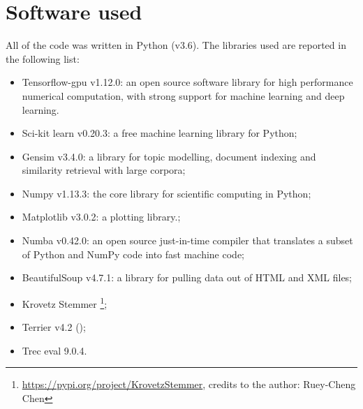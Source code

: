 \section{Software used}

All of the code was written in Python (v3.6). The libraries used are reported in the following list:

\begin{itemize}
 \item Tensorflow-gpu v1.12.0: an open source software library for high performance numerical computation, with strong support for machine learning and deep learning.
 \item Sci-kit learn v0.20.3: a free machine learning library for Python;
 \item Gensim v3.4.0: a library for topic modelling, document indexing and similarity retrieval with large corpora;
 \item Numpy v1.13.3: the core library for scientific computing in Python;
 \item Matplotlib v3.0.2: a plotting library.;
 \item Numba v0.42.0: an open source just-in-time compiler that translates a subset of Python and NumPy code into fast machine code;
 \item BeautifulSoup v4.7.1: a library for pulling data out of HTML and XML files;
 \item Krovetz Stemmer \footnote{\url{https://pypi.org/project/KrovetzStemmer}, credits to the author: Ruey-Cheng Chen};
 \item Terrier v4.2 (\cite{terrier});
 \item Trec eval 9.0.4.
\end{itemize}
